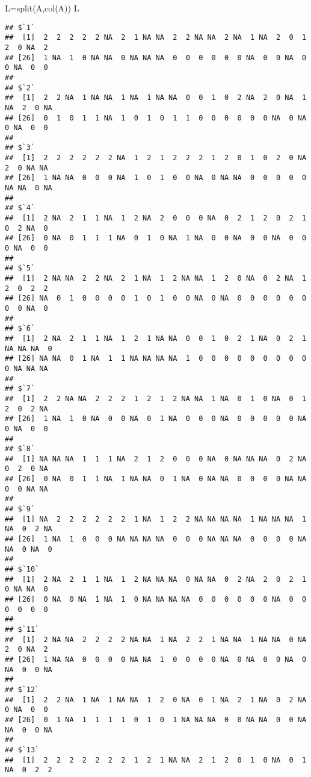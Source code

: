 \documentclass[
]{article}
\newenvironment{Shaded}{\begin{snugshade}}{\end{snugshade}}
\newcommand{\FunctionTok}[1]{\textcolor[rgb]{0.00,0.00,0.00}{#1}}
\newcommand{\NormalTok}[1]{#1}
\newcommand{\OtherTok}[1]{\textcolor[rgb]{0.56,0.35,0.01}{#1}}
\begin{document}
\begin{Shaded}
\begin{Highlighting}[]
\NormalTok{L}\OtherTok{=}\FunctionTok{split}\NormalTok{(A,}\FunctionTok{col}\NormalTok{(A))}
\NormalTok{L}
\end{Highlighting}
\end{Shaded}

\begin{verbatim}
## $`1`
##  [1]  2  2  2  2  2 NA  2  1 NA NA  2  2 NA NA  2 NA  1 NA  2  0  1  2  0 NA  2
## [26]  1 NA  1  0 NA NA  0 NA NA NA  0  0  0  0  0  0 NA  0  0 NA  0  0 NA  0  0
## 
## $`2`
##  [1]  2  2 NA  1 NA NA  1 NA  1 NA NA  0  0  1  0  2 NA  2  0 NA  1 NA  2  0 NA
## [26]  0  1  0  1  1 NA  1  0  1  0  1  1  0  0  0  0  0  0 NA  0 NA  0 NA  0  0
## 
## $`3`
##  [1]  2  2  2  2  2  2 NA  1  2  1  2  2  2  1  2  0  1  0  2  0 NA  2  0 NA NA
## [26]  1 NA NA  0  0  0 NA  1  0  1  0  0 NA  0 NA NA  0  0  0  0  0 NA NA  0 NA
## 
## $`4`
##  [1]  2 NA  2  1  1 NA  1  2 NA  2  0  0  0 NA  0  2  1  2  0  2  1  0  2 NA  0
## [26]  0 NA  0  1  1  1 NA  0  1  0 NA  1 NA  0  0 NA  0  0 NA  0  0  0 NA  0  0
## 
## $`5`
##  [1]  2 NA NA  2  2 NA  2  1 NA  1  2 NA NA  1  2  0 NA  0  2 NA  1  2  0  2  2
## [26] NA  0  1  0  0  0  0  1  0  1  0  0 NA  0 NA  0  0  0  0  0  0  0  0 NA  0
## 
## $`6`
##  [1]  2 NA  2  1  1 NA  1  2  1 NA NA  0  0  1  0  2  1 NA  0  2  1 NA NA NA  0
## [26] NA NA  0  1 NA  1  1 NA NA NA NA  1  0  0  0  0  0  0  0  0  0  0 NA NA NA
## 
## $`7`
##  [1]  2  2 NA NA  2  2  2  1  2  1  2 NA NA  1 NA  0  1  0 NA  0  1  2  0  2 NA
## [26]  1 NA  1  0 NA  0  0 NA  0  1 NA  0  0  0 NA  0  0  0  0  0 NA  0 NA  0  0
## 
## $`8`
##  [1] NA NA NA  1  1  1 NA  2  1  2  0  0  0 NA  0 NA NA NA  0  2 NA  0  2  0 NA
## [26]  0 NA  0  1  1 NA  1 NA NA  0  1 NA  0 NA NA  0  0  0  0 NA NA  0  0 NA NA
## 
## $`9`
##  [1] NA  2  2  2  2  2  2  1 NA  1  2  2 NA NA NA NA  1 NA NA NA  1 NA  0  2 NA
## [26]  1 NA  1  0  0  0 NA NA NA NA  0  0  0 NA NA NA  0  0  0  0 NA NA  0 NA  0
## 
## $`10`
##  [1]  2 NA  2  1  1 NA  1  2 NA NA NA  0 NA NA  0  2 NA  2  0  2  1  0 NA NA  0
## [26]  0 NA  0 NA  1 NA  1  0 NA NA NA NA  0  0  0  0  0  0 NA  0  0  0  0  0  0
## 
## $`11`
##  [1]  2 NA NA  2  2  2  2 NA NA  1 NA  2  2  1 NA NA  1 NA NA  0 NA  2  0 NA  2
## [26]  1 NA NA  0  0  0  0 NA NA  1  0  0  0  0 NA  0 NA  0  0 NA  0 NA  0  0 NA
## 
## $`12`
##  [1]  2  2 NA  1 NA  1 NA NA  1  2  0 NA  0  1 NA  2  1 NA  0  2 NA  0 NA  0  0
## [26]  0  1 NA  1  1  1  1  0  1  0  1 NA NA NA  0  0 NA NA  0  0 NA NA  0  0 NA
## 
## $`13`
##  [1]  2  2  2  2  2  2  2  1  2  1 NA NA  2  1  2  0  1  0 NA  0  1 NA  0  2  2

\end{verbatim}
\end{document}
